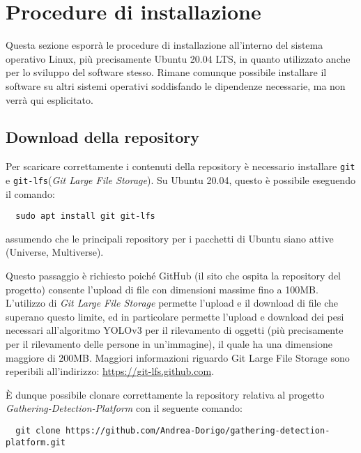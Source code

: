 \chapter{Procedure di installazione}\label{ProceduraDiInstallazione}
Questa sezione esporrà le procedure di installazione all'interno del sistema operativo Linux, più precisamente Ubuntu 20.04 LTS, in quanto utilizzato anche per lo sviluppo del software stesso.
Rimane comunque possibile installare il software su altri sistemi operativi soddisfando le dipendenze necessarie, ma non verrà qui esplicitato.

\section{Download della repository}\label{ProceduraDiInstallazioneDownloadRepo}
Per scaricare correttamente i contenuti della repository è necessario installare \texttt{git} e \texttt{git-lfs}(\textit{Git Large File Storage}).
Su Ubuntu 20.04, questo è possibile eseguendo il comando:
\begin{lstlisting}
  sudo apt install git git-lfs
\end{lstlisting}
assumendo che le principali repository per i pacchetti di Ubuntu siano attive (Universe, Multiverse).

Questo passaggio è richiesto poiché GitHub (il sito che ospita la repository del progetto) consente l'upload di file con dimensioni massime fino a 100MB.
L'utilizzo di \textit{Git Large File Storage} permette l'upload e il download di file che superano questo limite,  ed in particolare permette l'upload e download dei pesi necessari all'algoritmo YOLOv3 per il rilevamento di oggetti (più precisamente per il rilevamento delle persone in un'immagine), il quale ha una dimensione maggiore di 200MB. Maggiori informazioni riguardo Git Large File Storage sono reperibili all'indirizzo:
\newline
\url{https://git-lfs.github.com}.

È dunque possibile clonare correttamente la repository relativa al progetto \textit{Gathering-Detection-Platform} con il seguente comando:
\begin{lstlisting}
  git clone https://github.com/Andrea-Dorigo/gathering-detection-platform.git
\end{lstlisting}

